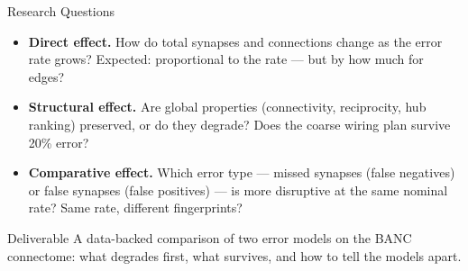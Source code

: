 \documentclass[aspectratio=169,11pt]{beamer}
\begin{document}
\begin{frame}{Research Questions}
\begin{itemize}
  \item \textbf{Direct effect.} How do total synapses and connections change
        as the error rate grows?
        \vskip2pt {\footnotesize\color{gray} Expected: proportional to the rate --- but by how much for edges?}
  \item \textbf{Structural effect.} Are global properties (connectivity,
        reciprocity, hub ranking) preserved, or do they degrade?
        \vskip2pt {\footnotesize\color{gray} Does the coarse wiring plan survive 20\% error?}
  \item \textbf{Comparative effect.} Which error type --- missed synapses
        (false negatives) or false synapses (false positives) --- is more
        disruptive at the same nominal rate?
        \vskip2pt {\footnotesize\color{gray} Same rate, different fingerprints?}
\end{itemize}

\vskip6pt
\begin{block}{Deliverable}
  \footnotesize
  A data-backed comparison of two error models on the BANC connectome:
  what degrades first, what survives, and how to tell the models apart.
\end{block}
\end{frame}
\end{document}
